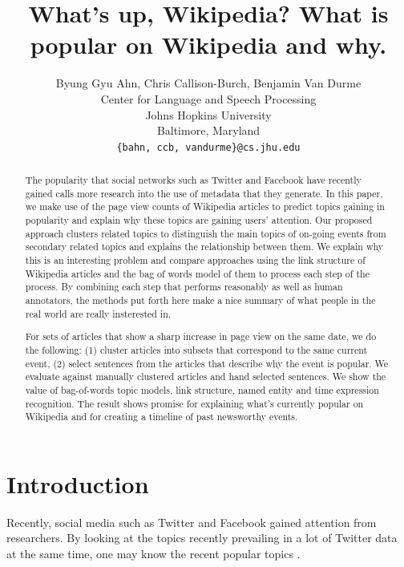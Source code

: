 \documentclass[11pt]{article}
\title{What's up, Wikipedia? What is popular on Wikipedia and why.}
\author{Byung Gyu Ahn, Chris Callison-Burch, Benjamin Van Durme \\
  Center for Language and Speech Processing \\
  Johns Hopkins University \\
  Baltimore, Maryland \\
  {\tt \{bahn, ccb, vandurme\}@cs.jhu.edu} \\}
\date{}
\begin{document}
\maketitle
\begin{abstract}
The popularity that social networks such as Twitter and Facebook have recently gained calls more research into the use of metadata that they generate. In this paper, we make use of the page view counts of Wikipedia articles to predict topics gaining in popularity and explain why these topics are gaining users' attention. Our proposed approach clusters related topics to distinguish the main topics of on-going events from secondary related topics and explains the relationship between them. We explain why this is an interesting problem and compare approaches using the link structure of Wikipedia articles and the bag of words model of them to process each step of the process. By combining each step that performs reasonably as well as human annotators, the methods put forth here make a nice summary of what people in the real world are really insterested in.

For sets of articles that show a sharp increase in page view on the same date, we do the following:
(1) cluster articles into subsets that correspond to the same current event, (2) select sentences from the articles that describe why the event is popular.
We evaluate against manually clustered articles and hand selected sentences.
We show the value of bag-of-words topic models, link structure, named entity and time expression recognition.
The result shows promise for explaining what's currently popular on Wikipedia and for creating a timeline of past newsworthy events.

\end{abstract}

\section{Introduction}

Recently, social media such as Twitter and Facebook gained attention from researchers.
By looking at the topics recently prevailing in a lot of Twitter data at the same time, one may know the recent popular topics \cite{Petrovic:10}.

\end{document}
